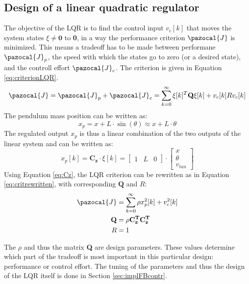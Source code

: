 \documentclass[a4paper,kul]{kulakarticle} %
\newcommand{\J}{\pazocal{J}}
\begin{document}
\subsection{Design of a linear quadratic regulator}
\label{sec:designLQR}
The objective of the LQR is to find the control input $v_c[k]$ that moves the system states $\xi \neq \mathbf{0}$ to \textbf{0}, in a way the performance criterion $\J$ is minimized. This means a tradeoff has to be made between performane $\J_p$, the speed with which the states go to zero (or a desired state), and the controll effort $\J_c$. The criterion is given in Equation \ref{eq:criterionLQR}. 
\begin{equation}
\J = \J_p + \J_c =  \sum_{k=0}^{\infty}\mathbf{\xi}[k]^T\mathbf{Q}\mathbf{\xi}[k] + v_c[k]Rv_c[k]
\label{eq:criterionLQR}
\end{equation}
The pendulum mass position can be written as:
\begin{equation}
x_p = x + L\cdot \sin(\theta) \approx x + L\cdot \theta
\label{eq:xp}
\end{equation}
The regulated output $x_p$ is thus a linear combination of the two outputs of the linear system and can be written as:
\begin{equation}
	x_p[k] = \mathbf{C_z}\cdot\xi[k] = \begin{bmatrix}
	1&L&0
	\end{bmatrix}\cdot\begin{bmatrix}
	x\\\theta\\v_{tan}
	\end{bmatrix}
	\label{eq:Cz}
\end{equation}
Using Equation \ref{eq:Cz}, the LQR criterion can be rewritten as in Equation \ref{eq:critrewritten}, with corresponding $\mathbf{Q}$ and $R$:
\begin{equation}
\begin{split}
	\J &=  \sum_{k=0}^{\infty}\rho x_p^2[k] + v_c^2[k]\\
	\mathbf{Q} &= \rho \mathbf{C_z^T}\mathbf{C_z^T}\\
	R &= 1
\end{split}
\label{eq:critrewritten}
\end{equation}


The $\rho$ and thus the matrix \textbf{Q} are design parameters. These values determine which part of the tradeoff is most important in this particular design: performance or control effort. The tuning of the parameters and thus the design of the LQR itself is done in Section \ref{sec:implFBcontr}. 
\end{document}
